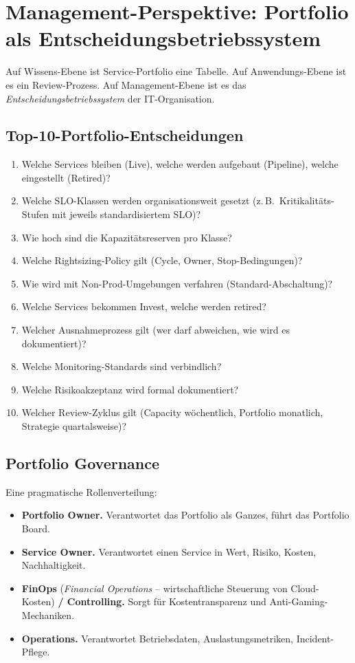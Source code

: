 \documentclass[11pt,a4paper,oneside]{article}
\newcommand{\fachbegriff}[1]{\textbf{#1}}
\begin{document}
\section{Management-Perspektive: Portfolio als Entscheidungsbetriebssystem}

Auf Wissens-Ebene ist Service-Portfolio eine Tabelle. Auf Anwendungs-Ebene ist es ein Review-Prozess. Auf Management-Ebene ist es das \emph{Entscheidungsbetriebssystem} der IT-Organisation.

\subsection{Top-10-Portfolio-Entscheidungen}

\begin{enumerate}
  \item Welche Services bleiben (Live), welche werden aufgebaut (Pipeline), welche eingestellt (Retired)?
  \item Welche SLO-Klassen werden organisationsweit gesetzt (z.\,B.\ Kritikalitäts-Stufen mit jeweils standardisiertem SLO)?
  \item Wie hoch sind die Kapazitätsreserven pro Klasse?
  \item Welche Rightsizing-Policy gilt (Cycle, Owner, Stop-Bedingungen)?
  \item Wie wird mit Non-Prod-Umgebungen verfahren (Standard-Abschaltung)?
  \item Welche Services bekommen Invest, welche werden retired?
  \item Welcher Ausnahmeprozess gilt (wer darf abweichen, wie wird es dokumentiert)?
  \item Welche Monitoring-Standards sind verbindlich?
  \item Welche Risikoakzeptanz wird formal dokumentiert?
  \item Welcher Review-Zyklus gilt (Capacity wöchentlich, Portfolio monatlich, Strategie quartalsweise)?
\end{enumerate}

\subsection{Portfolio Governance}

Eine pragmatische Rollenverteilung:

\begin{itemize}
  \item \fachbegriff{Portfolio Owner.} Verantwortet das Portfolio als Ganzes, führt das Portfolio Board.
  \item \fachbegriff{Service Owner.} Verantwortet einen Service in Wert, Risiko, Kosten, Nachhaltigkeit.
  \item \fachbegriff{FinOps} (\emph{Financial Operations} -- wirtschaftliche Steuerung von Cloud-Kosten) \fachbegriff{/ Controlling.} Sorgt für Kostentransparenz und Anti-Gaming-Mechaniken.
  \item \fachbegriff{Operations.} Verantwortet Betriebsdaten, Auslastungsmetriken, Incident-Pflege.
\end{itemize}
\end{document}
